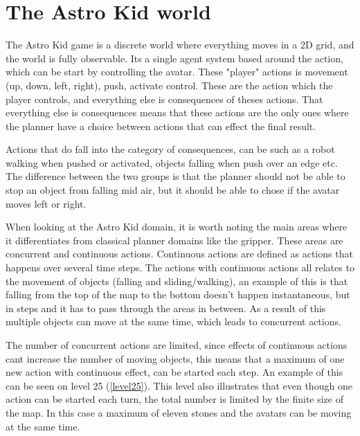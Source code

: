 	\chapter{The Astro Kid world}
	The Astro Kid game is a discrete world where everything moves in a 2D grid, and the world is fully observable. Its a single agent system based around the action, which can be start by controlling the avatar. These "player" actions is movement (up, down, left, right), push, activate control. These are the action which the player controls, and everything else is consequences of theses actions. That everything else is consequences means that these actions are the only ones where the planner have a choice between actions that can effect the final result. 
	
	
	Actions that do fall into the category of consequences, can be such as a robot walking when pushed or activated, objects falling when push over an edge etc. The difference between the two groups is that the planner should not be able to stop an object from falling mid air, but it should be able to chose if the avatar moves left or right. 
	
	When looking at the Astro Kid domain, it is worth noting the main areas where it differentiates from classical planner domains like the gripper. These areas are concurrent and continuous actions. Continuous actions are defined as actions that happens over several time steps. 
	The actions with continuous actions all relates to the movement of objects (falling and sliding/walking), an example of this is that falling from the top of the map to the bottom doesn't happen instantaneous, but in steps and it has to pass through the areas in between. As a result of this multiple objects can move at the same time, which leads to concurrent actions.
	
	The number of concurrent actions are limited, since effects of continuous actions cant increase the number of moving objects, this means that a maximum of one new action with continuous effect, can be started each step. An example of this can be seen on level 25 (\ref{level25}). This level also illustrates that even though one action can be started each turn, the total number is limited by the finite size of the map. In this case a maximum of eleven stones and the avatars can be moving at the same time.

